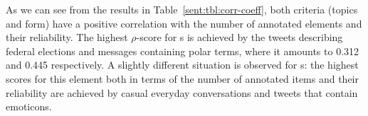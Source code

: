 As we can see from the results in Table~\ref{sent:tbl:corr-coeff},
both criteria (topics and form) have a positive correlation with the
number of annotated elements and their reliability.  The highest
$\rho$-score for s is achieved by the tweets
describing federal elections and messages containing polar terms,
where it amounts to 0.312 and 0.445 respectively.  A slightly
different situation is observed for s: the
highest scores for this element both in terms of the number of
annotated items and their reliability are achieved by casual everyday
conversations and tweets that contain emoticons.




